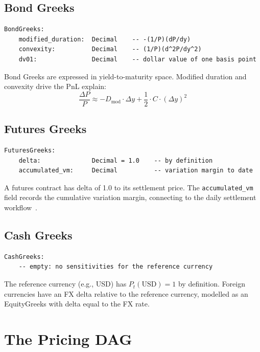 \documentclass[11pt,a4paper]{article}
\begin{document}
\subsection{Bond Greeks}

\begin{lstlisting}
BondGreeks:
    modified_duration:  Decimal    -- -(1/P)(dP/dy)
    convexity:          Decimal    -- (1/P)(d^2P/dy^2)
    dv01:               Decimal    -- dollar value of one basis point
\end{lstlisting}

\noindent Bond Greeks are expressed in yield-to-maturity space.  Modified duration and convexity drive the PnL explain:
\[
\frac{\Delta P}{P} \approx -D_{\mathrm{mod}} \cdot \Delta y + \frac{1}{2} \cdot C \cdot (\Delta y)^2
\]

\subsection{Futures Greeks}

\begin{lstlisting}
FuturesGreeks:
    delta:              Decimal = 1.0    -- by definition
    accumulated_vm:     Decimal          -- variation margin to date
\end{lstlisting}

\noindent A futures contract has delta of 1.0 to its settlement price.  The \texttt{accumulated\_vm} field records the cumulative variation margin, connecting to the daily settlement workflow~\cite[\S14.4.1]{ledger}.

\subsection{Cash Greeks}

\begin{lstlisting}
CashGreeks:
    -- empty: no sensitivities for the reference currency
\end{lstlisting}

\noindent The reference currency (e.g., USD) has $P_t(\mathrm{USD}) = 1$ by definition.  Foreign currencies have an FX delta relative to the reference currency, modelled as an EquityGreeks with delta equal to the FX rate.

\clearpage
\section{The Pricing DAG}
\label{sec:pricing-dag}
\end{document}
